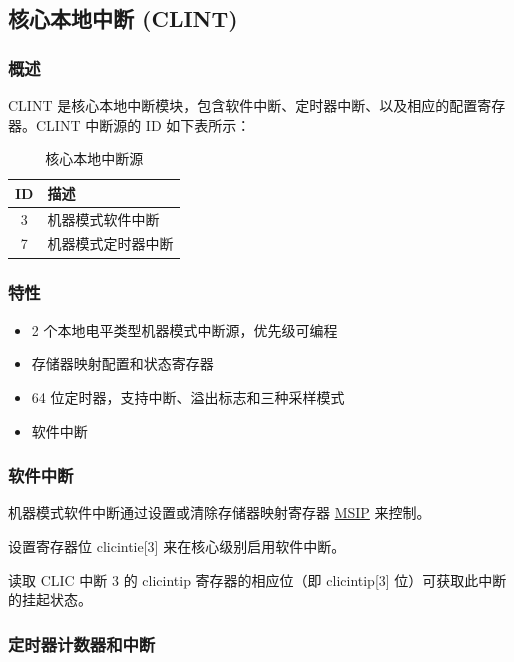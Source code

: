 \documentclass[main\_\_CN.tex]{subfiles}
\begin{document}


\newpage
\subsection{核心本地中断 (CLINT)}
\label{sec:riscvcpu-clint}
\subsubsection{概述}
\label{sec:riscvcpu-clint-overview}
CLINT 是核心本地中断模块，包含软件中断、定时器中断、以及相应的配置寄存器。CLINT 中断源的 ID 如下表所示：

\begin{longtable}{ | c | l | }
\caption{核心本地中断源} \label{tab:riscvcpu-clint-table}
\\ \hline
\rowcolor{lightgray}
ID & 描述 \\ \hline
3 & 机器模式软件中断 \\ \hline
7 & 机器模式定时器中断 \\ \hline
\end{longtable}


\subsubsection{特性}
\begin{itemize}
\item 2 个本地电平类型机器模式中断源，优先级可编程
\item 存储器映射配置和状态寄存器
\item 64 位定时器，支持中断、溢出标志和三种采样模式
\item 软件中断
\end{itemize}

\subsubsection{软件中断}
\label{sec:riscvcpu-clint-software}

机器模式软件中断通过设置或清除存储器映射寄存器 \hyperref[regdesc:CLINTMSIPREG]{MSIP} 来控制。

设置寄存器位 clicintie[3] 来在核心级别启用软件中断。

读取 CLIC 中断 3 的 clicintip 寄存器的相应位（即 clicintip[3] 位）可获取此中断的挂起状态。


\subsubsection{定时器计数器和中断}
\label{sec:riscvcpu-clint-timer}
\end{document}
